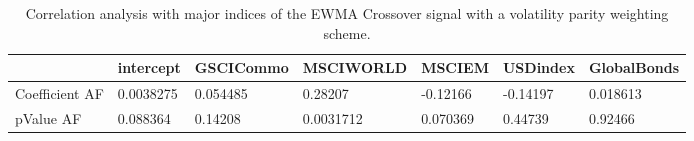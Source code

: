 \begin{table}[H]
\centering
\begin{tabular}{lllllll}
& intercept & GSCICommo & MSCIWORLD & MSCIEM & USDindex & GlobalBonds \\ 
\hline 
Coefficient AF & 0.0038275 & 0.054485 & 0.28207 & -0.12166 & -0.14197 & 0.018613 \\ 
pValue AF & 0.088364 & 0.14208 & 0.0031712 & 0.070369 & 0.44739 & 0.92466 \\ 
\hline
\end{tabular}
\caption{Correlation analysis with major indices of the EWMA Crossover signal with a volatility parity weighting scheme.}
\label{MBBS2_AFACTOR}
\end{table}